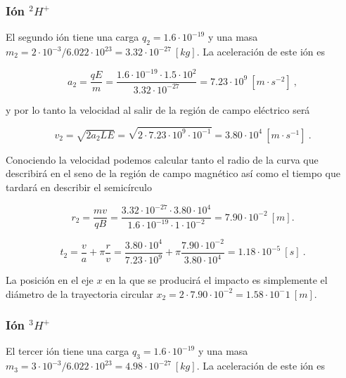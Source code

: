 \documentclass[journal]{IEEEtran}
\begin{document}
\subsubsection{Ión $^2H^+$}

El segundo ión tiene una carga $q_2 = 1.6\cdot 10^{-19}$ y una masa $m_2 = 2\cdot 10^{-3} / 6.022\cdot 10^{23} = 3.32\cdot 10^{-27}~[kg]$. La aceleración de este ión es

\begin{equation}
a_2 = \displaystyle\frac{qE}{m} = \displaystyle\frac{1.6\cdot 10^{-19}\cdot 1.5\cdot 10^{2}}{3.32\cdot 10^{-27}} = 7.23 \cdot 10^{9}~[m\cdot s^{-2}]~,
\end{equation}

y por lo tanto la velocidad al salir de la región de campo eléctrico será

\begin{equation}
v_2 = \sqrt{2a_2LE} = \sqrt{2\cdot 7.23 \cdot 10^{9} \cdot 10^{-1}} = 3.80 \cdot 10^4~[m\cdot s^{-1}]~.
\end{equation}

Conociendo la velocidad podemos calcular tanto el radio de la curva que describirá en el seno de la región de campo magnético así como el tiempo que tardará en describir el semicírculo

\begin{equation}
r_2 = \displaystyle\frac{mv}{qB} = \displaystyle\frac{3.32\cdot 10^{-27} \cdot 3.80\cdot 10^4}{1.6\cdot 10^{-19}\cdot 1 \cdot 10^{-2}} = 7.90\cdot 10^{-2}~[m].
\end{equation}

\begin{equation}
t_2 = \displaystyle\frac{v}{a} + \pi \displaystyle\frac{r}{v} = \displaystyle\frac{3.80 \cdot 10^4}{7.23 \cdot 10^{9}} + \pi \displaystyle\frac{7.90 \cdot 10^{-2}}{3.80 \cdot 10^4} = 1.18 \cdot 10^{-5}~[s]~.
\end{equation}

La posición en el eje $x$ en la que se producirá el impacto es simplemente el diámetro de la trayectoria circular $x_2 = 2\cdot7.90 \cdot 10^{-2} = 1.58 \cdot 10^-1~[m]$.

\subsubsection{Ión $^3H^+$}

El tercer ión tiene una carga $q_3 = 1.6\cdot 10^{-19}$ y una masa $m_3 = 3\cdot 10^{-3} / 6.022\cdot 10^{23} = 4.98\cdot 10^{-27}~[kg]$. La aceleración de este ión es
\end{document}
